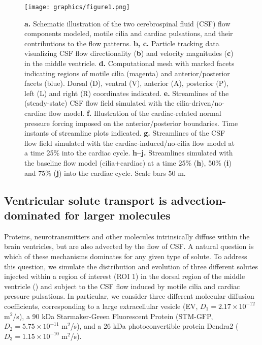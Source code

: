 \documentclass{WileyMSP-template}
\begin{document}
\begin{figure}
    \centering
    \texttt{[image: graphics/figure1.png]}
    \caption{
    \textbf{a.} Schematic illustration of the two cerebrospinal fluid (CSF) flow components modeled,
    motile cilia and cardiac pulsations, and their contributions to the flow patterns.
    \textbf{b, c.} Particle tracking data visualizing CSF flow directionality (\textbf{b}) and
    velocity magnitudes (\textbf{c}) in the middle ventricle.
    \textbf{d.} Computational mesh with marked facets indicating regions of motile cilia (magenta) and
    anterior/posterior facets (blue). Dorsal (D), ventral (V), anterior (A), posterior (P),
    left (L) and right (R) coordinates indicated.
    \textbf{e.} Streamlines of the (steady-state) CSF flow field simulated with the
    cilia-driven/no-cardiac flow model.
    \textbf{f.} Illustration of the cardiac-related normal pressure forcing imposed on the
    anterior/posterior boundaries. Time instants of streamline plots indicated.
    \textbf{g.} Streamlines of the CSF flow field simulated with the cardiac-induced/no-cilia flow
    model at a time 25\% into the cardiac cycle. %
    \textbf{h--j.} Streamlines simulated with the baseline flow model (cilia+cardiac)
    at a time 25\% (\textbf{h}), 50\% (\textbf{i}) and 75\% (\textbf{j})
    into the cardiac cycle. %
    Scale bars 50 \textmu m.
    }
    \label{fig:fig1}
\end{figure}

\subsection{Ventricular solute transport is advection-dominated for larger molecules}

Proteins, neurotransmitters and other molecules
intrinsically diffuse within the brain ventricles, but are also
advected by the flow of CSF. A natural question is which of these
mechanisms dominates for any given type of solute. To address this
question, we simulate the distribution and evolution of three
different solutes injected within a region of interest (ROI 1) in the
dorsal region of the middle ventricle () and
subject to the CSF flow induced by motile cilia and cardiac pressure
pulsations. In particular, we consider three different molecular
diffusion coefficients, corresponding to a large extracellular vesicle (EV, $D_1 = 2.17
\times 10^{-12}$ m$^2$/s), a 90 kDa Starmaker-Green Fluorescent Protein
(STM-GFP, $D_2 = 5.75 \times 10^{-11}$ m$^2$/s),
and a 26 kDa photoconvertible protein
Dendra2 ($D_3 = 1.15 \times 10^{-10}$ m$^2$/s).
\end{document}
